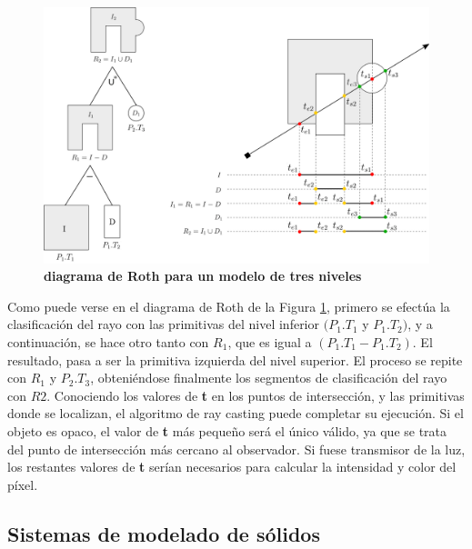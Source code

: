 \begin{figure}[!]
\includegraphics[width=15cm]{Img/GEO/ray3.png}
\centering
\caption{\textbf{\footnotesize{diagrama de Roth para un modelo de tres niveles}}}
\label{fig:visual3}
\end{figure}

Como puede verse en el diagrama de Roth de la Figura \ref{fig:visual3}, primero se efectúa la clasificación del rayo con las primitivas del nivel inferior $(P_1.T_1$ y $P_1.T_2)$, y a continuación, se hace otro tanto con $R_1$, que es igual a $(P_1.T_1 - P_1.T_2)$. El resultado, pasa a ser la primitiva izquierda del nivel superior. El proceso se repite con $R_1$ y $P_2.T_3$, obteniéndose finalmente los segmentos de clasificación del rayo con $R2$. Conociendo los valores de \textbf{t} en los puntos de intersección, y las primitivas donde se localizan, el algoritmo de ray casting puede completar su ejecución. Si el objeto es opaco, el valor de \textbf{t} más pequeño será el único válido, ya que se trata del punto de intersección más cercano al observador. Si fuese transmisor de la luz, los restantes valores de \textbf{t} serían necesarios para calcular la intensidad y color del píxel.


\clearpage
\subsection{Sistemas de modelado de sólidos }

